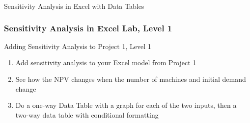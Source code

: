 \documentclass[handout, 11pt]{beamer}
\begin{document}
\begin{section}[SA Excel]{Sensitivity Analysis in Excel with Data Tables}
\begin{frame}
\frametitle{Sensitivity Analysis in Excel Lab, Level 1}
{
\begin{block}{Adding Sensitivity Analysis to Project 1, Level 1}
\begin{enumerate}
\item Add sensitivity analysis to your Excel model from Project 1
\item See how the NPV changes when the number of machines and initial demand change
\item Do a one-way Data Table with a graph for each of the two inputs, then a two-way data table with conditional formatting
\end{enumerate}
\vfill
\end{block}
}
\label{labs:sensitivity:excel-1}
\end{frame}
\end{section}
\end{document}
